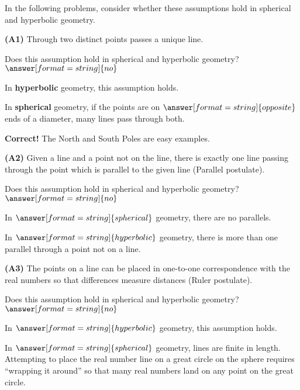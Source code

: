 \documentclass[nooutcomes]{ximera}
\begin{document}
In the following problems, consider whether these assumptions hold in spherical and hyperbolic geometry. 



\begin{problem}
\textbf{(A1)} Through two distinct points passes a unique line.

Does this assumption hold in spherical and hyperbolic geometry? 
$\answer[format=string]{no}$

\begin{problem}
In \textbf{hyperbolic} geometry, this assumption holds. 

In \textbf{spherical} geometry, if the points are on $\answer[format=string]{opposite}$ ends of a diameter, many lines pass through both.
\begin{feedback}
\textbf{Correct!} The North and South Poles are easy examples.  
\end{feedback}
\end{problem}
\end{problem}

\begin{problem}
\textbf{(A2)} Given a line and a point not on the line, there is exactly one line passing through the point which is parallel to the given line (Parallel postulate).

Does this assumption hold in spherical and hyperbolic geometry? 
$\answer[format=string]{no}$
\begin{problem}
In $\answer[format=string]{spherical}$ geometry, there are no parallels. 

In $\answer[format=string]{hyperbolic}$ geometry, there is more than one parallel through a point not on a line. 
\end{problem}
\end{problem}

\begin{problem}
\textbf{(A3)} The points on a line can be placed in one-to-one correspondence with the real numbers so that differences measure distances (Ruler postulate).  

Does this assumption hold in spherical and hyperbolic geometry? 
$\answer[format=string]{no}$

\begin{problem}
In $\answer[format=string]{hyperbolic}$ geometry, this assumption holds. 

In $\answer[format=string]{spherical}$ geometry, lines are finite in length.  Attempting to place the real number line on a great circle on the sphere requires ``wrapping it around'' so that many real numbers land on any point on the great circle.  
\end{problem}
\end{problem}
\end{document}
